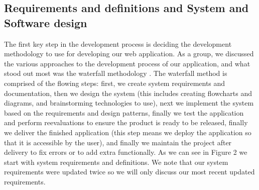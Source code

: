 \documentclass[12pt]{article}
\begin{document}
\subsection{Requirements and definitions and System and Software design}                   
 The first key step in the development process is deciding the development methodology to use for developing our web application. As a group, we discussed the various approaches to the development process of our application, and what stood out most was the waterfall methodology \cite{waseem_2022}. The waterfall method is comprised of the flowing steps: first, we create system requirements and documentation, then we design the system (this includes creating flowcharts and diagrams, and brainstorming technologies to use), next we implement the system based on the requirements and design patterns, finally we test the application and perform reevaluations to ensure the product is ready to be released, finally we deliver the finished application (this step means we deploy the application so that it is accessible by the user), and finally we maintain the project after delivery to fix errors or to add extra functionally. As we can see in Figure 2 we start with system requirements and definitions. We note that our system requirements were updated twice so we will only discuss our most recent updated requirements. 
\end{document}
